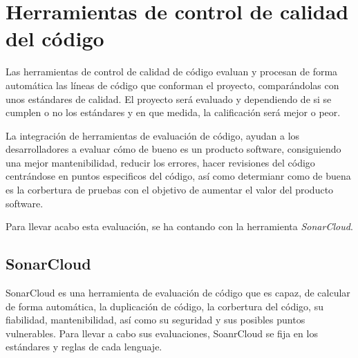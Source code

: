 \clearpage

\section{Herramientas de control de calidad del código} \label{calidad_codigo}
Las herramientas de control de calidad de código evaluan y procesan de forma automática las líneas de código que conforman el proyecto, comparándolas con unos estándares de calidad. El proyecto será evaluado y dependiendo de si se cumplen o no los estándares y en que medida, la calificación será mejor o peor.

La integración de herramientas de evaluación de código, ayudan a los desarrolladores a evaluar cómo de bueno es un producto software, consiguiendo una mejor mantenibilidad, reducir los errores, hacer revisiones del código centrándose en puntos especificos del código, así como determianr como de buena es la corbertura de pruebas con el objetivo de aumentar el valor del producto software.

Para llevar acabo esta evaluación, se ha contando con la herramienta \textit{SonarCloud}. 

\subsection*{SonarCloud}

SonarCloud \cite{sonar_cloud} es una herramienta de evaluación de código que es capaz, de calcular de forma automática, la duplicación de código, la corbertura del código, su fiabilidad, mantenibilidad, así como su seguridad y sus posibles puntos vulnerables.
Para llevar a cabo sus evaluaciones, SoanrCloud se fija en los estándares y reglas de cada lenguaje.

